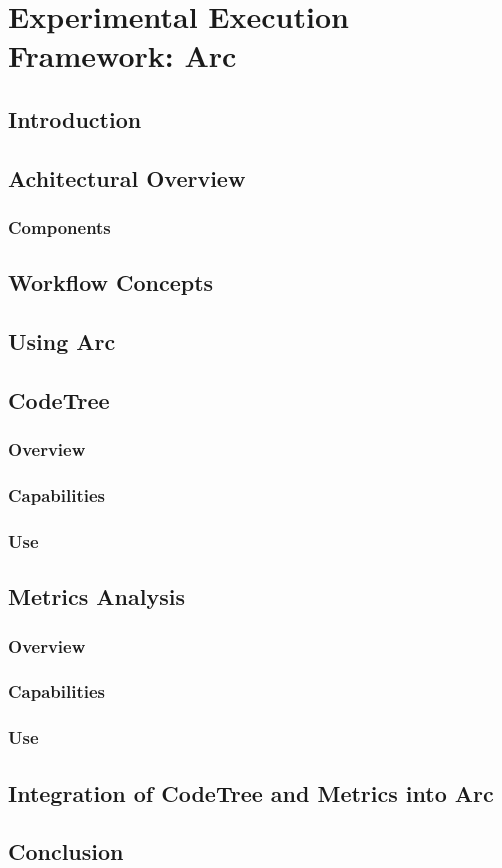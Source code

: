 \chapter{Experimental Execution Framework: Arc}

\section{Introduction}

\section{Achitectural Overview}

\subsection{Components}

\section{Workflow Concepts}

\section{Using Arc}

\section{CodeTree}

\subsection{Overview}

\subsection{Capabilities}

\subsection{Use}

\section{Metrics Analysis}

\subsection{Overview}

\subsection{Capabilities}

\subsection{Use}

\section{Integration of CodeTree and Metrics into Arc}

\section{Conclusion}